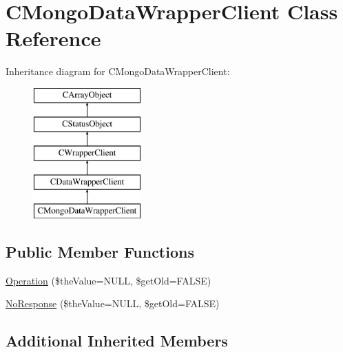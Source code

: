 \hypertarget{class_c_mongo_data_wrapper_client}{\section{C\-Mongo\-Data\-Wrapper\-Client Class Reference}
\label{class_c_mongo_data_wrapper_client}
}
Inheritance diagram for C\-Mongo\-Data\-Wrapper\-Client\-:\begin{figure}[H]
\begin{center}
\leavevmode
\includegraphics[height=5.000000cm]{class_c_mongo_data_wrapper_client}
\end{center}
\end{figure}
\subsection*{Public Member Functions}
\begin{DoxyCompactItemize}
\item 
\hyperlink{class_c_mongo_data_wrapper_client_a730c4fe3a66ad8a5aa42e44f669632ac}{Operation} (\$the\-Value=N\-U\-L\-L, \$get\-Old=F\-A\-L\-S\-E)
\item 
\hyperlink{class_c_mongo_data_wrapper_client_aba6b9751de7723443f54ad7f7b46897b}{No\-Response} (\$the\-Value=N\-U\-L\-L, \$get\-Old=F\-A\-L\-S\-E)
\end{DoxyCompactItemize}
\subsection*{Additional Inherited Members}


